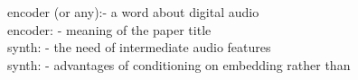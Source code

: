 \documentclass[a4paper, oneside, 12pt, english]{article}
\begin{document}





\color{red}
encoder (or any):- a word about digital audio  \\
encoder: - meaning of the paper title  \\
synth: - the need of intermediate audio features  \\
synth: - advantages of conditioning on embedding rather than \\
\color{black}


\clearpage

 


























\end{document}
